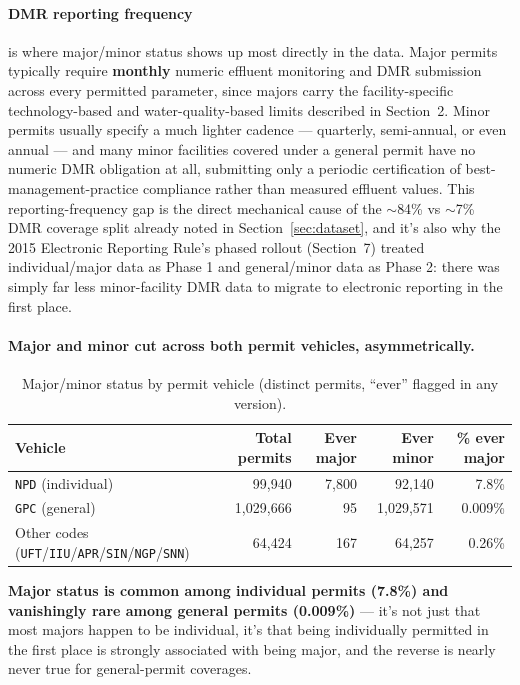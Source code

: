 \documentclass[11pt]{article}
\begin{document}
\paragraph{DMR reporting frequency} is where major/minor status shows up most
directly in the data. Major permits typically require \textbf{monthly} numeric
effluent monitoring and DMR submission across every permitted parameter, since
majors carry the facility-specific technology-based and water-quality-based
limits described in Section~2. Minor permits usually specify a much lighter
cadence --- quarterly, semi-annual, or even annual --- and many minor facilities
covered under a general permit have no numeric DMR obligation at all, submitting
only a periodic certification of best-management-practice compliance rather than
measured effluent values. This reporting-frequency gap is the direct mechanical
cause of the $\sim$84\% vs $\sim$7\% DMR coverage split already noted in
Section~\ref{sec:dataset}, and it's also why the 2015 Electronic Reporting Rule's
phased rollout (Section~7) treated individual/major data as Phase 1 and
general/minor data as Phase 2: there was simply far less minor-facility DMR data
to migrate to electronic reporting in the first place.

\paragraph{Major and minor cut across both permit vehicles, asymmetrically.}

\begin{table}[h]
\centering
\caption{Major/minor status by permit vehicle (distinct permits, ``ever''
flagged in any version).}\label{tab:majorminor}
\begin{tabular}{l r r r r}
\toprule
Vehicle & Total permits & Ever major & Ever minor & \% ever major \\
\midrule
\texttt{NPD} (individual) & 99,940 & 7,800 & 92,140 & 7.8\% \\
\texttt{GPC} (general) & 1,029,666 & 95 & 1,029,571 & 0.009\% \\
Other codes (\texttt{UFT}/\texttt{IIU}/\texttt{APR}/\texttt{SIN}/\texttt{NGP}/\texttt{SNN}) & 64,424 & 167 & 64,257 & 0.26\% \\
\bottomrule
\end{tabular}
\end{table}

\textbf{Major status is common among individual permits (7.8\%) and vanishingly
rare among general permits (0.009\%)} --- it's not just that most majors happen
to be individual, it's that being individually permitted in the first place is
strongly associated with being major, and the reverse is nearly never true for
general-permit coverages.
\end{document}
